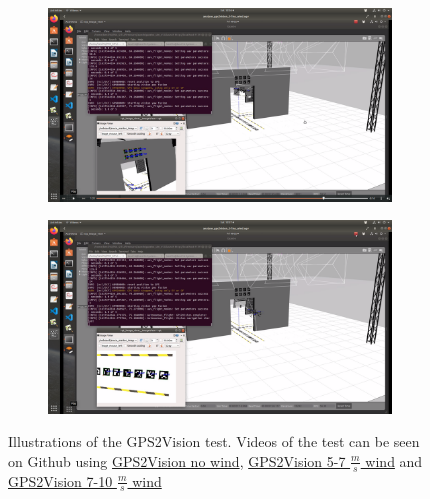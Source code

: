 \documentclass[../Head/report.tex]{subfiles}
\begin{document}
\begin{figure}[H]
\begin{subfigure}[t]{.30\textwidth}
        \caption{}
        \label{fig:gps2vision_navigate_to_board}
    \end{subfigure}
         \hspace{0.2em}
    \begin{subfigure}[t]{.30\textwidth}
        \centering
        \includegraphics[width=\textwidth]{../Figures/GPS2Vision/drone_gps2vision_transition.png}
        \caption{}
        \label{fig:gps2vision_gps2vision_transition}
    \end{subfigure}
         \hspace{0.2em}
    \begin{subfigure}[t]{.30\textwidth}
        \centering
        \includegraphics[width=\textwidth]{../Figures/GPS2Vision/drone_vision_navigation.png}
        \caption{}
        \label{fig:gps2vision_vision_navigation}
    \end{subfigure}
    \caption{Illustrations of the GPS2Vision test. Videos of the test can be seen on Github using \href{https://github.com/Kenil16/master_project/tree/master/test_videos/analyse_gps2vision_noWind}{GPS2Vision no wind}, \href{https://github.com/Kenil16/master_project/tree/master/test_videos/analyse_gps2vision_5-7ms_wind}{GPS2Vision 5-7 $\frac{m}{s}$ wind} and \href{https://github.com/Kenil16/master_project/tree/master/test_videos/analyse_gps2vision_7-10ms_wind}{GPS2Vision 7-10 $\frac{m}{s}$ wind}}
    \label{fig:gps2vision_states}
\end{figure}
\end{document}
